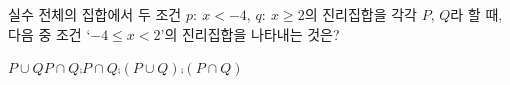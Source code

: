 실수 전체의 집합에서 두 조건 $p:\ x<-4$, $q:\ x\ge 2$의 진리집합을 각각 $P$, $Q$라 할 때, 다음 중 조건 `$-4\le x<2$'의 진리집합을 나타내는 것은?
\begin{choices32}{$P\cup Q$}{$P\cap Q$}{$\comp{P}\cap Q$}{$\comp{(P\cup Q)}$}{$\comp{(P\cap Q)}$}\end{choices32}
